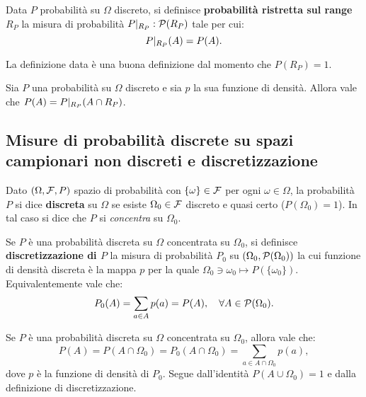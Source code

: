 \begin{multicols*}{2}
\begin{definition}
    Data $P$ probabilità su $\Omega$ discreto, si
    definisce \textbf{probabilità ristretta sul range $R_P$}
    la misura di probabilità $P\arrowvert_{R_P} : \mathcal{P}(R_P)$ tale
    per cui:
    \[
        P\arrowvert_{R_P}(A) = P(A).
    \]
\end{definition}

\begin{remark}
    La definizione data è una buona definizione dal momento che
    $P(R_P) = 1$.
\end{remark}

\begin{proposition}
    Sia $P$ una probabilità su $\Omega$ discreto e sia $p$ la
    sua funzione di densità. Allora vale che $P(A) = P\arrowvert_{R_P}(A \cap R_P)$.
\end{proposition}

\subsection{Misure di probabilità discrete su spazi campionari non discreti e discretizzazione}

\begin{definition}
    Dato $(\Omega, \mathcal{F}, P)$ spazio di probabilità con $\{\omega\} \in \mathcal{F}$ per
    ogni $\omega \in \Omega$, la probabilità $P$ si dice \textbf{discreta} su
    $\Omega$ se esiste $\Omega_0 \in \mathcal{F}$ discreto e quasi certo ($P(\Omega_0) = 1$).
    In tal caso si dice che $P$ si \textit{concentra} su $\Omega_0$.
\end{definition}

\begin{definition}
    Se $P$ è una probabilità discreta su $\Omega$ concentrata su $\Omega_0$,
    si definisce \textbf{discretizzazione di $P$} la misura di probabilità $P_0$
    su $(\Omega_0, \mathcal{P}(\Omega_0))$ la cui funzione di densità discreta
    è la mappa $p$ per la quale $\Omega_0 \ni \omega_0 \mapsto P(\{\omega_0\})$. Equivalentemente
    vale che:
    \[
        P_0(A) = \sum_{a \in A} p(a) = P(A), \quad \forall A \in \mathcal{P}(\Omega_0).
    \]
\end{definition}

\begin{proposition}
    Se $P$ è una probabilità discreta su $\Omega$ concentrata su $\Omega_0$, allora
    vale che:
    \[ 
        P(A) = P(A \cap \Omega_0) = P_0(A \cap \Omega_0) = \sum_{a \in A \cap \Omega_0} p(a),
    \]
    dove $p$ è la funzione di densità di $P_0$. Segue dall'identità $P(A \cup \Omega_0) = 1$ e dalla definizione di discretizzazione.
\end{proposition}


\end{multicols*}
